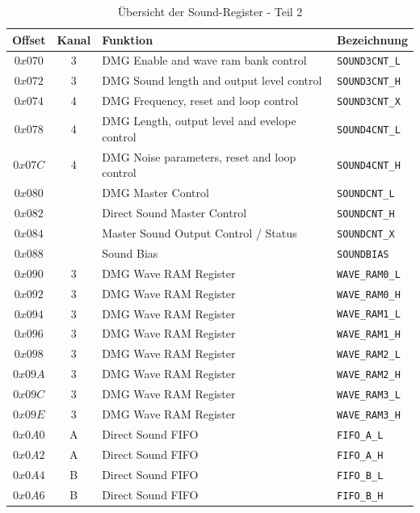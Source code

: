 \documentclass[11pt,a4paper]{scrartcl}
\begin{document}
\begin{table}[h]
    \centering
    \begin{tabular}{ c | c | p{10cm} | l }    
        \textbf{Offset} & \textbf{Kanal} & \textbf{Funktion} & \textbf{Bezeichnung} \\
        \hline
        $0x070$ & 3 & DMG Enable and wave ram bank control & \verb|SOUND3CNT_L| \\
        \hline
        $0x072$ & 3 & DMG Sound length and output level control & \verb|SOUND3CNT_H| \\
        \hline
        $0x074$ & 4 & DMG Frequency, reset and loop control & \verb|SOUND3CNT_X| \\
        \hline
        $0x078$ & 4 & DMG Length, output level and evelope control & \verb|SOUND4CNT_L| \\
        \hline
        $0x07C$ & 4 & DMG Noise parameters, reset and loop control & \verb|SOUND4CNT_H| \\
        \hline
        $0x080$ & & DMG Master Control & \verb|SOUNDCNT_L| \\
        \hline
        $0x082$ & & Direct Sound Master Control & \verb|SOUNDCNT_H| \\
        \hline
        $0x084$ & & Master Sound Output Control / Status & \verb|SOUNDCNT_X| \\
        \hline
        $0x088$ & & Sound Bias & \verb|SOUNDBIAS| \\
        \hline
        $0x090$ & 3 & DMG Wave RAM Register & \verb|WAVE_RAM0_L| \\
        \hline
        $0x092$ & 3 & DMG Wave RAM Register & \verb|WAVE_RAM0_H| \\
        \hline
        $0x094$ & 3 & DMG Wave RAM Register & \verb|WAVE_RAM1_L| \\
        \hline
        $0x096$ & 3 & DMG Wave RAM Register & \verb|WAVE_RAM1_H| \\
        \hline
        $0x098$ & 3 & DMG Wave RAM Register & \verb|WAVE_RAM2_L| \\
        \hline
        $0x09A$ & 3 & DMG Wave RAM Register & \verb|WAVE_RAM2_H| \\
        \hline
        $0x09C$ & 3 & DMG Wave RAM Register & \verb|WAVE_RAM3_L| \\
        \hline
        $0x09E$ & 3 & DMG Wave RAM Register & \verb|WAVE_RAM3_H| \\
        \hline
        $0x0A0$ & A & Direct Sound FIFO & \verb|FIFO_A_L| \\
        \hline
        $0x0A2$ & A & Direct Sound FIFO & \verb|FIFO_A_H| \\
        \hline
        $0x0A4$ & B & Direct Sound FIFO & \verb|FIFO_B_L| \\
        \hline
        $0x0A6$ & B & Direct Sound FIFO & \verb|FIFO_B_H| \\
    \end{tabular}
    \caption{\"Ubersicht der Sound-Register - Teil 2}
    \label{table:SoundRegister2}
\end{table}
\end{document}
